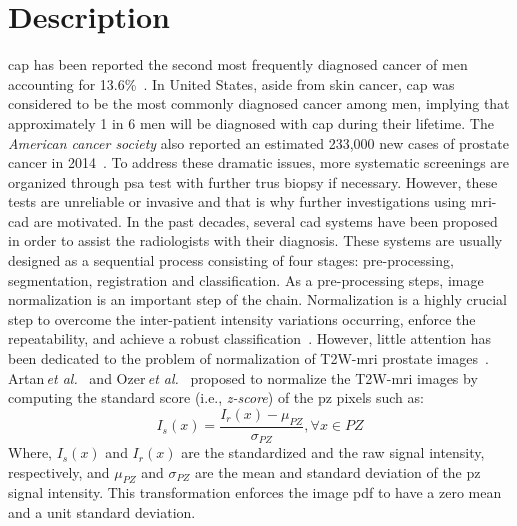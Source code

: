 \graphicspath{ {./content/intro/figures/} }

\section{Description}
\label{sec:descr}  %

\Ac{cap} has been reported the second most frequently diagnosed cancer of men accounting for 13.6\%~\cite{ferlay2010estimates}. 
In United States, aside from skin cancer, \ac{cap} was considered to be the most commonly diagnosed cancer among men, implying that approximately 1 in 6 men will be diagnosed with \ac{cap} during their lifetime.
The \textit{American cancer society} also reported an estimated 233,000 new cases of prostate cancer in 2014~\cite{CancerFactsFigures2014}. 
To address these dramatic issues, more systematic screenings are organized through \ac{psa} test with further \ac{trus} biopsy if necessary.
However, these tests are unreliable or invasive and that is why further investigations using \ac{mri}-\ac{cad} are motivated. 
In the past decades, several \ac{cad} systems have been proposed in order to assist the radiologists with their diagnosis. 
These systems are usually designed as a sequential process consisting of four stages: pre-processing, segmentation, registration and classification.
As a pre-processing steps, image normalization is an important step of the chain. 
Normalization is a highly crucial step to overcome the inter-patient intensity variations occurring, enforce the repeatability, and achieve a robust classification~\cite{Lemaitre2015}.
However, little attention has been dedicated to the problem of normalization of T2W-\ac{mri} prostate images~\cite{Lemaitre2015}.
Artan\,\textit{et al.}~\cite{artan2010prostate,artan2009prostate} and Ozer\,\textit{et al.}~\cite{ozer2009prostate,ozer2010supervised} proposed to normalize the T2W-\ac{mri} images by computing the standard score (i.e., \textit{z-score}) of the \ac{pz} pixels such as: 
\begin{equation}
  I_{s}(x) = \frac{I_{r}(x) - \mu_{PZ}}{\sigma_{PZ}}, \forall x\in PZ 
  \label{eq:zscore}
\end{equation}
\noindent Where, $I_{s}(x)$ and $I_{r}(x)$ are the standardized and the raw signal intensity, respectively, and $\mu_{PZ}$ and $\sigma_{PZ}$ are the mean and standard deviation of the \ac{pz} signal intensity. 
This transformation enforces the image \ac{pdf} to have a zero mean and a unit standard deviation.
